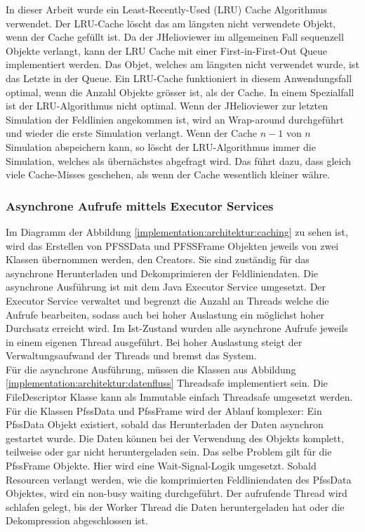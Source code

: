 In dieser Arbeit wurde ein Least-Recently-Used (LRU) Cache Algorithmus verwendet. Der LRU-Cache löscht das am längsten nicht verwendete Objekt, wenn der Cache gefüllt ist. Da der JHelioviewer im allgemeinen Fall sequenzell Objekte verlangt, kann der LRU Cache mit einer First-in-First-Out Queue implementiert werden. Das Objet, welches am längsten nicht  verwendet wurde, ist das Letzte in der Queue. Ein LRU-Cache funktioniert in diesem Anwendungsfall optimal, wenn die Anzahl Objekte grösser ist, als der Cache. In einem Spezialfall ist der LRU-Algorithmus nicht optimal. Wenn der JHelioviewer zur letzten Simulation der Feldlinien angekommen ist, wird an Wrap-around durchgeführt und wieder die erste Simulation verlangt. Wenn der Cache $n-1$ von $n$ Simulation abspeichern kann, so löscht der LRU-Algorithmus immer die Simulation, welches als übernächstes abgefragt wird. Das führt dazu, dass gleich viele Cache-Misses geschehen, als wenn der Cache wesentlich kleiner währe.

\subsubsection{Asynchrone Aufrufe mittels Executor Services}
Im Diagramm der Abbildung \ref{implementation:architektur:caching} zu sehen ist, wird das Erstellen von PFSSData und PFSSFrame Objekten jeweils von zwei Klassen übernommen werden, den Creators. Sie sind zuständig für das asynchrone Herunterladen und Dekomprimieren der Feldliniendaten. Die asynchrone Ausführung ist mit dem Java Executor Service umgesetzt. Der Executor Service verwaltet und begrenzt die Anzahl an Threads welche die Aufrufe bearbeiten, sodass auch bei hoher Auslastung ein möglichst hoher Durchsatz erreicht wird. Im Ist-Zustand wurden alle asynchrone Aufrufe jeweils in einem eigenen Thread ausgeführt. Bei hoher Auslastung steigt der Verwaltungsaufwand der Threads und bremst das System.\\
Für die asynchrone Ausführung, müssen die Klassen aus Abbildung \ref{implementation:architektur:datenfluss} Threadsafe implementiert sein. Die FileDescriptor Klasse kann als Immutable einfach Threadsafe umgesetzt werden. Für die Klassen PfssData und PfssFrame wird der Ablauf komplexer: Ein PfssData Objekt existiert, sobald das Herunterladen der Daten asynchron gestartet wurde. Die Daten können bei der Verwendung des Objekts komplett, teilweise oder gar nicht heruntergeladen sein. Das selbe Problem gilt für die PfssFrame Objekte. Hier wird eine Wait-Signal-Logik umgesetzt. Sobald Resourcen verlangt werden, wie die komprimierten Feldliniendaten des PfssData Objektes, wird ein non-busy waiting durchgeführt. Der aufrufende Thread wird schlafen gelegt, bis der Worker Thread die Daten heruntergeladen hat oder die Dekompression abgeschlossen ist.